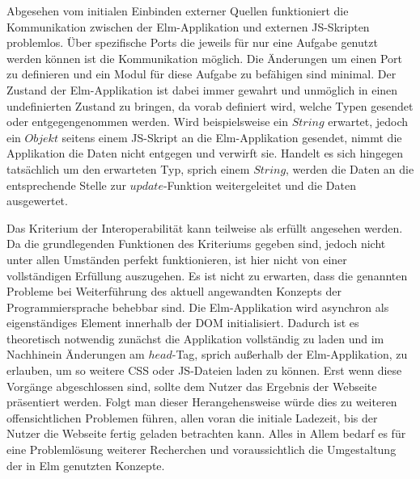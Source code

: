 Abgesehen vom initialen Einbinden externer Quellen funktioniert die Kommunikation zwischen der Elm-Applikation und externen \ac{JS}-Skripten problemlos. Über spezifische Ports die jeweils für nur eine Aufgabe genutzt werden können ist die Kommunikation möglich. Die Änderungen um einen Port zu definieren und ein Modul für diese Aufgabe zu befähigen sind minimal. Der Zustand der Elm-Applikation ist dabei immer gewahrt und unmöglich in einen undefinierten Zustand zu bringen, da vorab definiert wird, welche Typen gesendet oder entgegengenommen werden. Wird beispielsweise ein $String$ erwartet, jedoch ein $Objekt$ seitens einem \ac{JS}-Skript an die Elm-Applikation gesendet, nimmt die Applikation die Daten nicht entgegen und verwirft sie. Handelt es sich hingegen tatsächlich um den erwarteten Typ, sprich einem $String$, werden die Daten an die entsprechende Stelle zur $update$-Funktion weitergeleitet und die Daten ausgewertet.

Das Kriterium der Interoperabilität kann teilweise als erfüllt angesehen werden.
Da die grundlegenden Funktionen des Kriteriums gegeben sind, jedoch nicht unter allen Umständen perfekt funktionieren, ist hier nicht von einer vollständigen Erfüllung auszugehen. Es ist nicht zu erwarten, dass die genannten Probleme bei Weiterführung des aktuell angewandten Konzepts der Programmiersprache behebbar sind. Die Elm-Applikation wird asynchron als eigenständiges Element innerhalb der \ac{DOM} initialisiert. Dadurch ist es theoretisch notwendig zunächst die Applikation vollständig zu laden und im Nachhinein Änderungen am $head$-Tag, sprich außerhalb der Elm-Applikation, zu erlauben, um so weitere \ac{CSS} oder \ac{JS}-Dateien laden zu können. Erst wenn diese Vorgänge abgeschlossen sind, sollte dem Nutzer das Ergebnis der Webseite präsentiert werden. Folgt man dieser Herangehensweise würde dies zu weiteren offensichtlichen Problemen führen, allen voran die initiale Ladezeit, bis der Nutzer die Webseite fertig geladen betrachten kann. Alles in Allem bedarf es für eine Problemlösung weiterer Recherchen und voraussichtlich die Umgestaltung der in Elm genutzten Konzepte.

